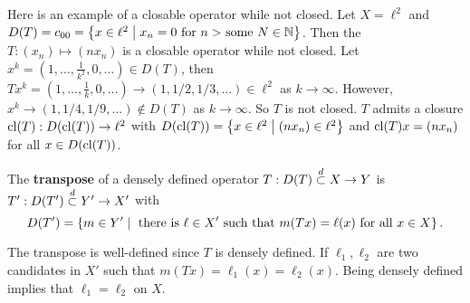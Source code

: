 \begin{example}
    Here is an example of a closable operator while not closed. 
    Let $X = \ell^2$ and $D(T) = c_{00} = \left\{ x\in\ell^2 \;\middle\vert\; x_n = 0\text{ for $n > $ some $N\in\mathbb{N}$} \right\}$. 
    Then the $T:(x_n)\mapsto (n x_n)$ is a closable operator while not closed. 
    Let $x^k = (1,\ldots,\frac{1}{k^2},0,\ldots)\in D(T)$, 
    then $Tx^k = (1,\ldots,\frac{1}{k},0,\ldots)\to (1,1/2,1/3,\ldots)\in\ell^2$ as $k\to\infty$. 
    However, $x^k\to (1,1/4,1/9,\ldots)\notin D(T)$ as $k\to\infty$. 
    So $T$ is not closed. $T$ admits a closure $\operatorname{cl}(T):D(\operatorname{cl}(T))\to\ell^2$ 
    with $D(\operatorname{cl}(T)) = \left\{ x\in\ell^2 \;\middle\vert\; (n x_n)\in\ell^2 \right\}$ and 
    $\operatorname{cl}(T)x = (n x_n)$ for all $x\in D(\operatorname{cl}(T))$. 
\end{example}

\begin{definition}
    The \textbf{transpose} of a densely defined operator $T:D(T)\overset{d}{\subset} X\to Y$ is 
    $T': D(T')\overset{d}{\subset} Y'\to X'$ with 
    \begin{equation*}
        D(T') = \left\{ m\in Y' \;\middle\vert\; \text{ there is $\ell\in X'$ such that $m(Tx) = \ell(x)$ for all $x\in X$} \right\}.
    \end{equation*}
\end{definition}
\begin{remark}
    The transpose is well-defined since $T$ is densely defined. If $\ell_1,\ell_2$ are 
    two candidates in $X'$ such that $m(Tx) = \ell_1(x) = \ell_2(x)$. Being densely 
    defined implies that $\ell_1 = \ell_2$ on $X$. 
\end{remark}



